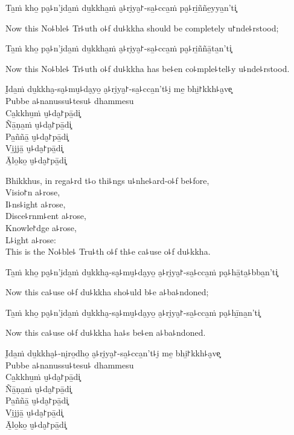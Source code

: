 Ta̱ṁ kho̱ pa̮꜕n'i̮da̱ṁ du̱kkha̱ṁ a̮꜕ri̮ya̮꜓-sa̱꜕cca̱ṁ pa̮꜕ri̱ññe̱yya̱n'ti͓

\begin{english}
  Now this No꜕ble꜕ Tr꜕uth o꜕f du꜕kkha should be completely u꜓nde꜕rstood;
\end{english}

Ta̱ṁ kho̱ pa̮꜕n'i̮da̱ṁ du̱kkha̱ṁ a̮꜕ri̮ya̮꜓-sa̱꜕cca̱ṁ pa̮꜕ri̱ññā̱ta̱n'ti͓

\begin{english}
  Now this No꜕ble꜕ Tr꜕uth o꜕f du꜕kkha has be꜕en co꜕mple꜕tel꜕y u꜕nde꜕rstood.
\end{english}

\ifaivedition
\clearpage
\fi

I̮da̱ṁ du̱kkha̮-sa̮꜕mu̮꜕da̮yo̱ a̮꜕ri̮ya̮꜓-sa̱꜕cca̱n't꜕i̮ me̱ bhi̱꜓kkh꜕a̮ve͓\\
Pubbe a꜕nanussu꜕tesu꜕ dhammesu\\
Ca̱kkhu̱ṁ u̮꜕da̮꜓pā̱di͓\\
Ñā̱ṇa̱ṁ u̮꜕da̮꜓pā̱di͓\\
Pa̱ññā̱ u̮꜕da̮꜓pā̱di͓\\
Vi̱jjā̱ u̮꜕da̮꜓pā̱di͓\\
Ā̱lo̱ko̱ u̮꜕da̮꜓pā̱di͓

\begin{english}
  Bhikkhus, in rega꜕rd t꜕o thi꜕ngs u꜕nhe꜕ard-o꜕f be꜕fore,\\
  Visio꜓n a꜕rose,\\
  I꜕ns꜕ight a꜕rose,\\
  Disce꜕rnm꜕ent a꜕rose,\\
  Knowle꜓dge a꜕rose,\\
  L꜕ight a꜕rose:\\
  This is the No꜕ble꜕ Tru꜕th o꜕f th꜕e ca꜕use o꜕f du꜕kkha.
\end{english}

Ta̱ṁ kho̱ pa̮꜕n'i̮da̱ṁ du̱kkha̮-sa̮꜕mu̮꜕da̮yo̱ a̮꜕ri̮ya̮꜓-sa̱꜕cca̱ṁ pa̮꜕hā̱ta̱꜕bba̱n'ti͓

\begin{english}
  Now this ca꜕use o꜕f du꜕kkha sho꜕uld b꜕e a꜕ba꜕ndoned;
\end{english}

Ta̱ṁ kho̱ pa̮꜕n'i̮da̱ṁ du̱kkha̮-sa̮꜕mu̮꜕da̮yo̱ a̮꜕ri̮ya̮꜓-sa̱꜕cca̱ṁ pa̮꜕hī̱na̱n'ti͓

\begin{english}
  Now this ca꜕use o꜕f du꜕kkha ha꜕s be꜕en a꜕ba꜕ndoned.
\end{english}

I̮da̱ṁ du̱kkha̮꜕-ni̮ro̱dho̱ a̮꜕ri̮ya̮꜓-sa̱꜕cca̱n't꜕i̮ me̱ bhi̱꜓kkh꜕a̮ve͓\\
Pubbe a꜕nanussu꜕tesu꜕ dhammesu\\
Ca̱kkhu̱ṁ u̮꜕da̮꜓pā̱di͓\\
Ñā̱ṇa̱ṁ u̮꜕da̮꜓pā̱di͓\\
Pa̱ññā̱ u̮꜕da̮꜓pā̱di͓\\
Vi̱jjā̱ u̮꜕da̮꜓pā̱di͓\\
Ā̱lo̱ko̱ u̮꜕da̮꜓pā̱di͓

